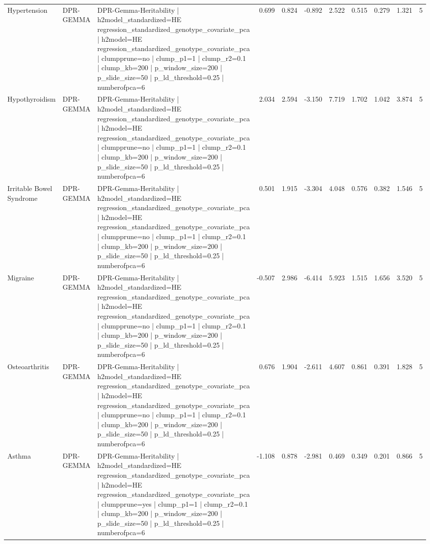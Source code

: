\begin{landscape}
\begin{longtable}{p{2.4cm}p{1.8cm}p{6.0cm}rrrrrrrr}
Hypertension & DPR-GEMMA & DPR-Gemma-Heritability | h2model\_standardized=HE regression\_standardized\_genotype\_covariate\_pca | h2model=HE regression\_standardized\_genotype\_covariate\_pca | clumpprune=no | clump\_p1=1 | clump\_r2=0.1 | clump\_kb=200 | p\_window\_size=200 | p\_slide\_size=50 | p\_ld\_threshold=0.25 | numberofpca=6 & 0.699 & 0.824 & -0.892 & 2.522 & 0.515 & 0.279 & 1.321 & 5 \\
Hypothyroidism & DPR-GEMMA & DPR-Gemma-Heritability | h2model\_standardized=HE regression\_standardized\_genotype\_covariate\_pca | h2model=HE regression\_standardized\_genotype\_covariate\_pca | clumpprune=no | clump\_p1=1 | clump\_r2=0.1 | clump\_kb=200 | p\_window\_size=200 | p\_slide\_size=50 | p\_ld\_threshold=0.25 | numberofpca=6 & 2.034 & 2.594 & -3.150 & 7.719 & 1.702 & 1.042 & 3.874 & 5 \\
Irritable Bowel Syndrome & DPR-GEMMA & DPR-Gemma-Heritability | h2model\_standardized=HE regression\_standardized\_genotype\_covariate\_pca | h2model=HE regression\_standardized\_genotype\_covariate\_pca | clumpprune=no | clump\_p1=1 | clump\_r2=0.1 | clump\_kb=200 | p\_window\_size=200 | p\_slide\_size=50 | p\_ld\_threshold=0.25 | numberofpca=6 & 0.501 & 1.915 & -3.304 & 4.048 & 0.576 & 0.382 & 1.546 & 5 \\
Migraine & DPR-GEMMA & DPR-Gemma-Heritability | h2model\_standardized=HE regression\_standardized\_genotype\_covariate\_pca | h2model=HE regression\_standardized\_genotype\_covariate\_pca | clumpprune=no | clump\_p1=1 | clump\_r2=0.1 | clump\_kb=200 | p\_window\_size=200 | p\_slide\_size=50 | p\_ld\_threshold=0.25 | numberofpca=6 & -0.507 & 2.986 & -6.414 & 5.923 & 1.515 & 1.656 & 3.520 & 5 \\
Osteoarthritis & DPR-GEMMA & DPR-Gemma-Heritability | h2model\_standardized=HE regression\_standardized\_genotype\_covariate\_pca | h2model=HE regression\_standardized\_genotype\_covariate\_pca | clumpprune=no | clump\_p1=1 | clump\_r2=0.1 | clump\_kb=200 | p\_window\_size=200 | p\_slide\_size=50 | p\_ld\_threshold=0.25 | numberofpca=6 & 0.676 & 1.904 & -2.611 & 4.607 & 0.861 & 0.391 & 1.828 & 5 \\
Asthma & DPR-GEMMA & DPR-Gemma-Heritability | h2model\_standardized=HE regression\_standardized\_genotype\_covariate\_pca | h2model=HE regression\_standardized\_genotype\_covariate\_pca | clumpprune=yes | clump\_p1=1 | clump\_r2=0.1 | clump\_kb=200 | p\_window\_size=200 | p\_slide\_size=50 | p\_ld\_threshold=0.25 | numberofpca=6 & -1.108 & 0.878 & -2.981 & 0.469 & 0.349 & 0.201 & 0.866 & 5 \\

\end{longtable}
\end{landscape}
